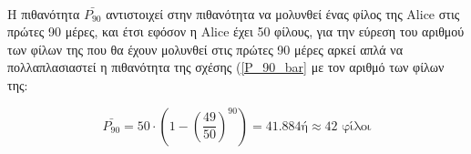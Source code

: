 \noindent\\
Η πιθανότητα $\bar{P_{90}}$ αντιστοιχεί στην πιθανότητα να μολυνθεί ένας φίλος της Alice στις πρώτες 90 μέρες, και έτσι εφόσον η Alice έχει 50 φίλους, για την εύρεση του αριθμού των φίλων της που θα έχουν μολυνθεί στις πρώτες 90 μέρες αρκεί απλά να πολλαπλασιαστεί η πιθανότητα της σχέσης (\ref{P_90_bar} με τον αριθμό των φίλων της:

\begin{equation}
	\bar{P_{90}}= 50 \cdot \left( 1 -  \left(\frac{49}{50} \right)^{90} \right) = 41.884 ή \approx 42 \text{ φίλοι} \label{P_90_bar_50}
\end{equation}